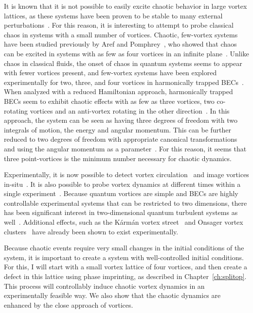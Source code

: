 It is known that it is not possible to easily excite chaotic behavior in large vortex lattices, as these systems have been proven to be stable to many external perturbations~\cite{o2017}.
For this reason, it is interesting to attempt to probe classical chaos in systems with a small number of vortices.
Chaotic, few-vortex systems have been studied previously by Aref and Pomphrey~\cite{aref1982, aref1980, aref1983}, who showed that chaos can be excited in systems with as few as four vortices in an infinite plane~\cite{aref1982}.
Unlike chaos in classical fluids, the onset of chaos in quantum systems seems to appear with fewer vortices present, and few-vortex systems have been explored experimentally for two, three, and four vortices in harmonically trapped BECs~\cite{navarro2013}.
When analyzed with a reduced Hamiltonian approach, harmonically trapped BECs seem to exhibit chaotic effects with as few as three vortices, two co-rotating vortices and an anti-vortex rotating in the other direction~\cite{kyriakopoulos2014,koukouloyannis2014}.
In this approach, the system can be seen as having three degrees of freedom with two integrals of motion, the energy and angular momentum.
This can be further reduced to two degrees of freedom with appropriate canonical transformations and using the angular momentum as a parameter~\cite{koukouloyannis2014}.
For this reason, it seems that three point-vortices is the minimum number necessary for chaotic dynamics.

Experimentally, it is now possible to detect vortex circulation~\cite{seo2017} and image vortices in-situ~\cite{wilson2015}.
It is also possible to probe vortex dynamics at different times within a single experiment~\cite{freilich2010, serafini2017}.
Because quantum vortices are simple and BECs are highly controllable experimental systems that can be restricted to two dimensions, there has been significant interest in two-dimensional quantum turbulent systems as well~\cite{neely2013,shin2004}.
Additional effects, such as the K\'arm\'an vortex street~\cite{kwon2014} and Onsager vortex clusters~\cite{gauthier2018,johnstone2018} have already been shown to exist experimentally.

Because chaotic events require very small changes in the initial conditions of the system, it is important to create a system with well-controlled initial conditions.
For this, I will start with a small vortex lattice of four vortices, and then create a defect in this lattice using phase imprinting, as described in Chapter~\ref{ch:splitop}.
This process will controllably induce chaotic vortex dynamics in an experimentally feasible way.
We also show that the chaotic dynamics are enhanced by the close approach of vortices.

